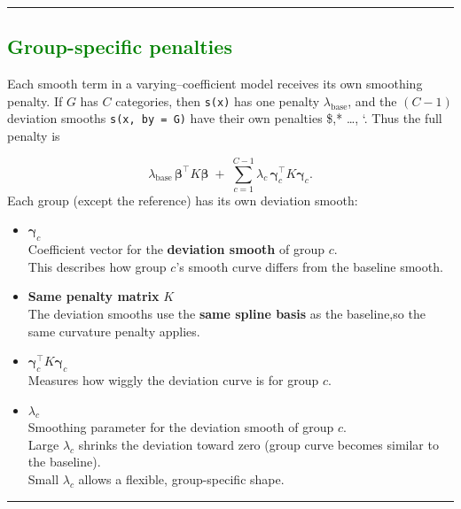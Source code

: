 \documentclass[
  letterpaper,
  DIV=11,
  numbers=noendperiod]{scrreprt}
\begin{document}
\begin{center}\rule{0.5\linewidth}{0.5pt}\end{center}

\hypertarget{section-39}{%
\subsection*{\texorpdfstring{\textcolor{green}{Group-specific penalties}}{}}\label{section-39}}

Each smooth term in a varying--coefficient model receives its own
smoothing penalty. If \(G\) has \(C\) categories, then \texttt{s(x)} has
one penalty \(\lambda_{\text{base}}\), and the \((C-1)\) deviation
smooths \texttt{s(x,\ by\ =\ G)} have their own penalties \$,*
\dots, `. Thus the full penalty is

\[
\lambda_{\text{base}}\,\boldsymbol{\beta}^\top K \boldsymbol{\beta}
\;+\;
\sum_{c=1}^{C-1}
\lambda_c\,\boldsymbol{\gamma}_c^\top K \boldsymbol{\gamma}_c.
\] Each group (except the reference) has its own deviation smooth:

\begin{itemize}
\item
  \(\boldsymbol{\gamma}_c\)\\
  Coefficient vector for the \textbf{deviation smooth} of group \(c\).\\
  This describes how group \(c\)'s smooth curve differs from the
  baseline smooth.
\item
  \textbf{Same penalty matrix} \(K\)\\
  The deviation smooths use the \textbf{same spline basis} as the
  baseline,so the same curvature penalty applies.
\item
  \(\boldsymbol{\gamma}_c^\top K \boldsymbol{\gamma}_c\)\\
  Measures how wiggly the deviation curve is for group \(c\).
\item
  \(\lambda_c\)\\
  Smoothing parameter for the deviation smooth of group \(c\).\\
  Large \(\lambda_c\) shrinks the deviation toward zero (group curve
  becomes similar to the baseline).\\
  Small \(\lambda_c\) allows a flexible, group-specific shape.
\end{itemize}

\begin{center}\rule{0.5\linewidth}{0.5pt}\end{center}
\end{document}
